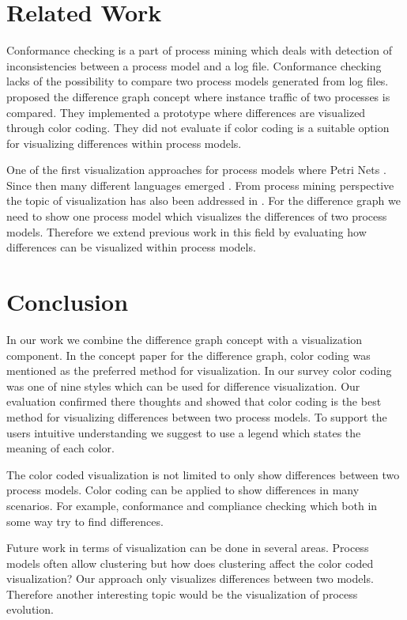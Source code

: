 \documentclass{llncs}
\begin{document}
\section{Related Work}  %
\label{sec:RelatedWork}

Conformance checking \cite{lit:ConformanceCheckingOfProcesses} is a part of process mining \cite{lit:BusinnessProcessMiningAnIndustrialAppliction,lit:PMDiscoveryConformanceEnhancement} which deals with detection of inconsistencies between a process model and a log file. Conformance checking lacks of the possibility to compare two process models generated from log files. \cite{lit:VisuApprDiffAnalysis} proposed the difference graph concept where instance traffic of two processes is compared. They implemented a prototype where differences are visualized through color coding. They did not evaluate if color coding is a suitable option for visualizing differences within process models.

One of the first visualization approaches for process models where Petri Nets \cite{lit:Petrinet}. Since then many different languages emerged \cite{lit:YAWL,lit:UML,lit:EPC}. From process mining perspective the topic of visualization has also been addressed in \cite{lit:ProMFramework}. For the difference graph we need to show one process model which visualizes the differences of two process models. Therefore we extend previous work in this field by evaluating how differences can be visualized within process models.

\section{Conclusion} %
\label{sec:Conclusion}
In our work we combine the difference graph concept with a visualization component. In the concept paper for the difference graph, color coding was mentioned as the preferred method for visualization. In our survey color coding was one of nine styles which can be used for difference visualization. Our evaluation confirmed there thoughts and showed that color coding is the best method for visualizing differences between two process models. To support the users intuitive understanding we suggest to use a legend which states the meaning of each color.

The color coded visualization is not limited to only show differences between two process models. Color coding can be applied to show differences in many scenarios. For example, conformance and compliance checking which both in some way try to find differences.

Future work in terms of visualization can be done in several areas. Process models often allow clustering but how does clustering affect the color coded visualization? Our approach only visualizes differences between two models. Therefore another interesting topic would be the visualization of process evolution. 



\end{document}
